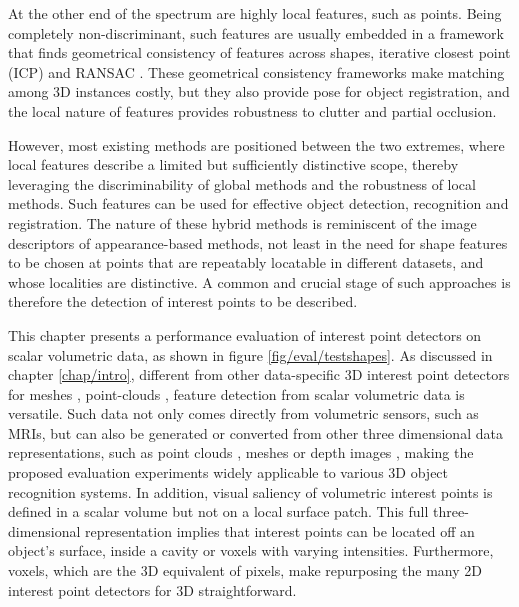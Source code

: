 At the other end of the spectrum are highly local features, such as points. Being completely non-discriminant, such features are usually embedded in a framework that finds geometrical consistency of features across shapes, \eg iterative closest point (ICP) \cite{Besl1992} and RANSAC \cite{Brown2005, Papazov2011}. 
These geometrical consistency frameworks make matching among 3D instances costly, but they also provide pose for object registration, and the local nature of features provides robustness to clutter and partial occlusion. 

However, most existing methods are positioned between the two extremes, where local features describe a limited but sufficiently distinctive scope, thereby leveraging the discriminability of global methods and the robustness of local methods. 
Such features can be used for effective object detection, recognition and registration. The nature of these hybrid methods is reminiscent of the image descriptors of appearance-based methods, not least in the need for shape features to be chosen at points that are repeatably locatable in different datasets, and whose localities are distinctive. 
A common and crucial stage of such approaches is therefore the detection of interest points to be described.  

This chapter presents a performance evaluation of interest point detectors on scalar volumetric data, as shown in figure \ref{fig/eval/testshapes}.   
As discussed in chapter \ref{chap/intro}, different from other data-specific 3D interest point detectors for meshes \cite{Sipiran2011,Glomb2009,Zaharescu2009}, point-clouds \cite{Aanaes2012,Unnikrishnan2008}, feature detection from scalar volumetric data is versatile. Such data not only comes directly from volumetric sensors, such as MRIs, but can also be generated or converted from other three dimensional data representations, such as point clouds \cite{Pham2011}, meshes \cite{Knopp2010} or depth images \cite{Hadfield2013}, making the proposed evaluation experiments widely applicable to various 3D object recognition systems.
In addition, visual saliency of volumetric interest points is defined in a scalar volume but not on a local surface patch. This full three-dimensional representation implies that interest points can be located off an object's surface, \eg inside a cavity or voxels with varying intensities. 
Furthermore, voxels, which are the 3D equivalent of pixels, make repurposing the many 2D interest point detectors for 3D straightforward. 

